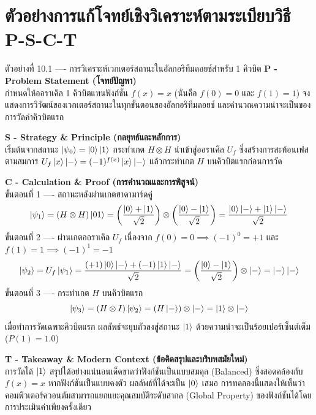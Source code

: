 \section{ตัวอย่างการแก้โจทย์เชิงวิเคราะห์ตามระเบียบวิธี P-S-C-T}

\begin{psctbox}{ตัวอย่างที่ 10.1 ---- การวิเคราะห์เวกเตอร์สถานะในอัลกอริทึมดอยช์สำหรับ 1 คิวบิต}
\noindent\textbf{P - Problem Statement (โจทย์ปัญหา)} \\
กำหนดให้ออราเคิล 1 คิวบิตแทนฟังก์ชัน $f(x) = x$ (นั่นคือ $f(0) = 0$ และ $f(1) = 1$) จงแสดงการวิวัฒน์ของเวกเตอร์สถานะในทุกขั้นตอนของอัลกอริทึมดอยช์ และคำนวณความน่าจะเป็นของการวัดค่าคิวบิตแรก

\vspace{4pt}
\noindent\textbf{S - Strategy \& Principle (กลยุทธ์และหลักการ)} \\
เริ่มต้นจากสถานะ $\ket{\psi_0} = \ket{0}\ket{1}$ กระทำเกต $H \otimes H$ นำเข้าสู่ออราเคิล $U_f$ ซึ่งสร้างการสะท้อนเฟสตามสมการ $U_f\ket{x}\ket{-} = (-1)^{f(x)}\ket{x}\ket{-}$ แล้วกระทำเกต $H$ บนคิวบิตแรกก่อนการวัด

\vspace{4pt}
\noindent\textbf{C - Calculation \& Proof (การคำนวณและการพิสูจน์)} \\
ขั้นตอนที่ 1 ---- สถานะหลังผ่านเกตฮาดามาร์ดคู่
\begin{equation}
\ket{\psi_1} = (H \otimes H)\ket{01} = \left( \frac{\ket{0}+\ket{1}}{\sqrt{2}} \right) \otimes \left( \frac{\ket{0}-\ket{1}}{\sqrt{2}} \right) = \frac{\ket{0}\ket{-} + \ket{1}\ket{-}}{\sqrt{2}}
\end{equation}
ขั้นตอนที่ 2 ---- ผ่านเกตออราเคิล $U_f$ เนื่องจาก $f(0)=0 \implies (-1)^0 = +1$ และ $f(1)=1 \implies (-1)^1 = -1$
\begin{equation}
\ket{\psi_2} = U_f \ket{\psi_1} = \frac{(+1)\ket{0}\ket{-} + (-1)\ket{1}\ket{-}}{\sqrt{2}} = \left( \frac{\ket{0}-\ket{1}}{\sqrt{2}} \right) \otimes \ket{-} = \ket{-}\ket{-}
\end{equation}
ขั้นตอนที่ 3 ---- กระทำเกต $H$ บนคิวบิตแรก
\begin{equation}
\ket{\psi_3} = (H \otimes I)\ket{\psi_2} = (H\ket{-}) \otimes \ket{-} = \ket{1} \otimes \ket{-}
\end{equation}
เมื่อทำการวัดเฉพาะคิวบิตแรก ผลลัพธ์จะยุบตัวลงสู่สถานะ $\ket{1}$ ด้วยความน่าจะเป็นร้อยเปอร์เซ็นต์เต็ม ($P(1) = 1.0$)

\vspace{4pt}
\noindent\textbf{T - Takeaway \& Modern Context (ข้อคิดสรุปและบริบทสมัยใหม่)} \\
การวัดได้ $\ket{1}$ สรุปได้อย่างแน่นอนเด็ดขาดว่าฟังก์ชันเป็นแบบสมดุล (Balanced) ซึ่งสอดคล้องกับ $f(x)=x$ หากฟังก์ชันเป็นแบบคงตัว ผลลัพธ์ที่ได้จะเป็น $\ket{0}$ เสมอ การทดลองนี้แสดงให้เห็นว่าคอมพิวเตอร์ควอนตัมสามารถแยกแยะคุณสมบัติระดับสากล (Global Property) ของฟังก์ชันได้โดยการประเมินค่าเพียงครั้งเดียว
\end{psctbox}


